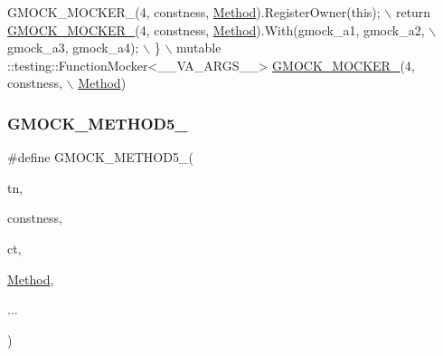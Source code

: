 \begin{DoxyCode}
    GMOCK\_MOCKER\_(4, constness, \hyperlink{gmock-spec-builders__test_8cc_a95606368148f3e5aab5db46c32466afd}{Method}).RegisterOwner(\textcolor{keyword}{this}); \(\backslash\)
    return \hyperlink{gmock-generated-function-mockers_8h_a7d362499e27b1bc3a9806dd3cf58a5b7}{GMOCK\_MOCKER\_}(4, constness, \hyperlink{gmock-spec-builders__test_8cc_a95606368148f3e5aab5db46c32466afd}{Method}).With(gmock\_a1, gmock\_a2, \(\backslash\)
        gmock\_a3, gmock\_a4); \(\backslash\)
  \} \(\backslash\)
  mutable ::testing::FunctionMocker<\_\_VA\_ARGS\_\_> \hyperlink{gmock-generated-function-mockers_8h_a7d362499e27b1bc3a9806dd3cf58a5b7}{GMOCK\_MOCKER\_}(4, constness, \(\backslash\)
      \hyperlink{gmock-spec-builders__test_8cc_a95606368148f3e5aab5db46c32466afd}{Method})
\end{DoxyCode}
\mbox{\label{gmock-generated-function-mockers_8h_a9e3ecd392499ab19a4a6d3adcabf56f6}} 
\subsubsection{\texorpdfstring{G\+M\+O\+C\+K\+\_\+\+M\+E\+T\+H\+O\+D5\+\_\+}{GMOCK\_METHOD5\_}}
{\footnotesize\ttfamily \#define G\+M\+O\+C\+K\+\_\+\+M\+E\+T\+H\+O\+D5\+\_\+(\begin{DoxyParamCaption}\item[{}]{tn,  }\item[{}]{constness,  }\item[{}]{ct,  }\item[{}]{\hyperlink{gmock-spec-builders__test_8cc_a95606368148f3e5aab5db46c32466afd}{Method},  }\item[{}]{... }\end{DoxyParamCaption})}

